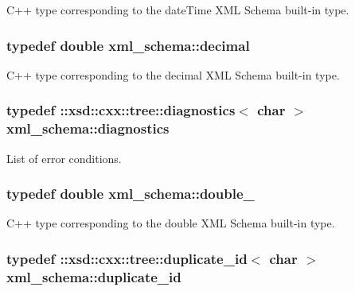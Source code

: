 C++ type corresponding to the date\-Time X\-M\-L Schema built-\/in type. 

\hypertarget{namespacexml__schema_a69bfaf24f63a8c18ebd8e21db6b343df}{
\subsubsection[{decimal}]{\setlength{\rightskip}{0pt plus 5cm}typedef double {\bf xml\-\_\-schema\-::decimal}}}\label{namespacexml__schema_a69bfaf24f63a8c18ebd8e21db6b343df}


C++ type corresponding to the decimal X\-M\-L Schema built-\/in type. 

\hypertarget{namespacexml__schema_a62cc106990ec99fdaf2f3364d98cfabd}{
\subsubsection[{diagnostics}]{\setlength{\rightskip}{0pt plus 5cm}typedef \-::xsd\-::cxx\-::tree\-::diagnostics$<$ char $>$ {\bf xml\-\_\-schema\-::diagnostics}}}\label{namespacexml__schema_a62cc106990ec99fdaf2f3364d98cfabd}


List of error conditions. 

\hypertarget{namespacexml__schema_aac2d3d3483d3a20e8d96d2e8e5b3a470}{
\subsubsection[{double\-\_\-}]{\setlength{\rightskip}{0pt plus 5cm}typedef double {\bf xml\-\_\-schema\-::double\-\_\-}}}\label{namespacexml__schema_aac2d3d3483d3a20e8d96d2e8e5b3a470}


C++ type corresponding to the double X\-M\-L Schema built-\/in type. 

\hypertarget{namespacexml__schema_a22a2b3c973b87b06c2868d85a154fd63}{
\subsubsection[{duplicate\-\_\-id}]{\setlength{\rightskip}{0pt plus 5cm}typedef \-::xsd\-::cxx\-::tree\-::duplicate\-\_\-id$<$ char $>$ {\bf xml\-\_\-schema\-::duplicate\-\_\-id}}}\label{namespacexml__schema_a22a2b3c973b87b06c2868d85a154fd63}


